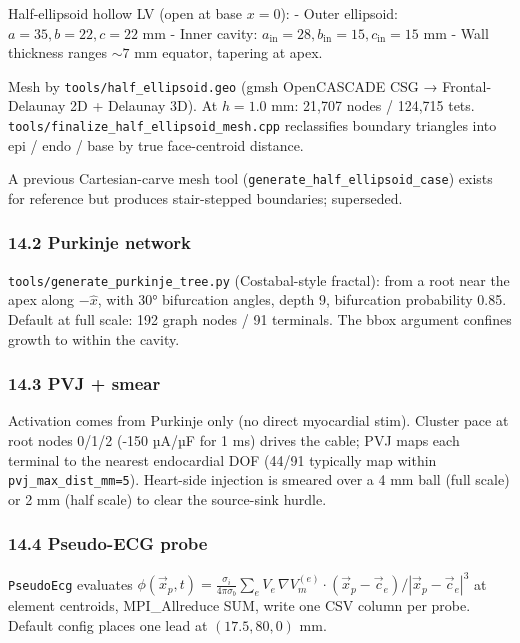 \documentclass[
  11pt,
]{article}
\begin{document}
Half-ellipsoid hollow LV (open at base \(x=0\)): - Outer ellipsoid:
\(a=35, b=22, c=22\) mm - Inner cavity:
\(a_\mathrm{in}=28, b_\mathrm{in}=15, c_\mathrm{in}=15\) mm - Wall
thickness ranges \(\sim 7\) mm equator, tapering at apex.

Mesh by \texttt{tools/half\_ellipsoid.geo} (gmsh OpenCASCADE CSG →
Frontal- Delaunay 2D + Delaunay 3D). At \(h=1.0\) mm: 21,707 nodes /
124,715 tets. \texttt{tools/finalize\_half\_ellipsoid\_mesh.cpp}
reclassifies boundary triangles into epi / endo / base by true
face-centroid distance.

A previous Cartesian-carve mesh tool
(\texttt{generate\_half\_ellipsoid\_case}) exists for reference but
produces stair-stepped boundaries; superseded.

\hypertarget{purkinje-network}{%
\subsubsection{14.2 Purkinje network}\label{purkinje-network}}

\texttt{tools/generate\_purkinje\_tree.py} (Costabal-style fractal):
from a root near the apex along \(-\hat{x}\), with 30° bifurcation
angles, depth 9, bifurcation probability 0.85. Default at full scale:
192 graph nodes / 91 terminals. The bbox argument confines growth to
within the cavity.

\hypertarget{pvj-smear}{%
\subsubsection{14.3 PVJ + smear}\label{pvj-smear}}

Activation comes from Purkinje only (no direct myocardial stim). Cluster
pace at root nodes 0/1/2 (-150 µA/µF for 1 ms) drives the cable; PVJ
maps each terminal to the nearest endocardial DOF (44/91 typically map
within \texttt{pvj\_max\_dist\_mm=5}). Heart-side injection is smeared
over a 4 mm ball (full scale) or 2 mm (half scale) to clear the
source-sink hurdle.

\hypertarget{pseudo-ecg-probe}{%
\subsubsection{14.4 Pseudo-ECG probe}\label{pseudo-ecg-probe}}

\texttt{PseudoEcg} evaluates
\(\phi(\vec x_p, t) = \frac{\sigma_i}{4\pi\sigma_b} \sum_e V_e\, \nabla V_m^{(e)} \cdot (\vec x_p - \vec c_e) / |\vec x_p - \vec c_e|^3\)
at element centroids, MPI\_Allreduce SUM, write one CSV column per
probe. Default config places one lead at \((17.5, 80, 0)\) mm.
\end{document}
